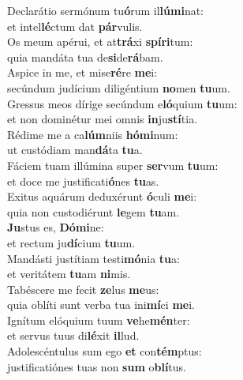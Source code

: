 \evenverse Declarátio sermónum tu\textbf{ó}rum il\textbf{lú}\textbf{mi}nat:~\*\\
\evenverse et intel\textbf{lé}ctum dat \textbf{pár}vulis.\\
\oddverse Os meum apérui, et at\textbf{trá}xi \textbf{spí}\textbf{ri}tum:~\*\\
\oddverse quia mandáta tua de\textbf{si}de\textbf{rá}bam.\\
\evenverse Aspice in me, et mise\textbf{ré}re \textbf{me}i:~\*\\
\evenverse secúndum judícium diligéntium \textbf{no}men \textbf{tu}um.\\
\oddverse Gressus meos dírige secúndum e\textbf{ló}quium \textbf{tu}um:~\*\\
\oddverse et non dominétur mei omnis \textbf{in}ju\textbf{stí}tia.\\
\evenverse Rédime me a ca\textbf{lúm}niis \textbf{hó}\textbf{mi}num:~\*\\
\evenverse ut custódiam man\textbf{dá}ta \textbf{tu}a.\\
\oddverse Fáciem tuam illúmina super \textbf{ser}vum \textbf{tu}um:~\*\\
\oddverse et doce me justificati\textbf{ó}nes \textbf{tu}as.\\
\evenverse Exitus aquárum deduxérunt \textbf{ó}culi \textbf{me}i:~\*\\
\evenverse quia non custodiérunt \textbf{le}gem \textbf{tu}am.\\
\oddverse \textbf{Ju}stus es, \textbf{Dó}\textbf{mi}ne:~\*\\
\oddverse et rectum ju\textbf{dí}cium \textbf{tu}um.\\
\evenverse Mandásti justítiam testi\textbf{mó}nia \textbf{tu}a:~\*\\
\evenverse et veritátem \textbf{tu}am \textbf{ni}mis.\\
\oddverse Tabéscere me fecit \textbf{ze}lus \textbf{me}us:~\*\\
\oddverse quia oblíti sunt verba tua ini\textbf{mí}ci \textbf{me}i.\\
\evenverse Ignítum elóquium tuum \textbf{ve}he\textbf{mén}ter:~\*\\
\evenverse et servus tuus di\textbf{lé}xit \textbf{il}lud.\\
\oddverse Adolescéntulus sum ego \textbf{et} con\textbf{tém}ptus:~\*\\
\oddverse justificatiónes tuas non \textbf{sum} o\textbf{blí}tus.\\
